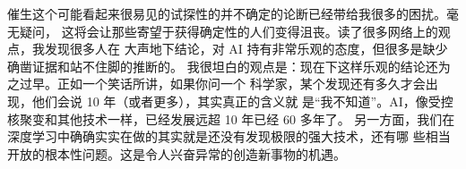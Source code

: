 催生这个可能看起来很易见的试探性的并不确定的论断已经带给我很多的困扰。毫无疑问，
这将会让那些寄望于获得确定性的人们变得沮丧。读了很多网络上的观点，我发现很多人在
大声地下结论，对 AI 持有非常乐观的态度，但很多是缺少确凿证据和站不住脚的推断的。
我很坦白的观点是：现在下这样乐观的结论还为之过早。正如一个笑话所讲，如果你问一个
科学家，某个发现还有多久才会出现，他们会说 10 年（或者更多），其实真正的含义就
是“我不知道”。AI，像受控核聚变和其他技术一样，已经发展远超 10 年已经 60 多年了。
另一方面，我们在深度学习中确确实实在做的其实就是还没有发现极限的强大技术，还有哪
些相当开放的根本性问题。这是令人兴奋异常的创造新事物的机遇。
